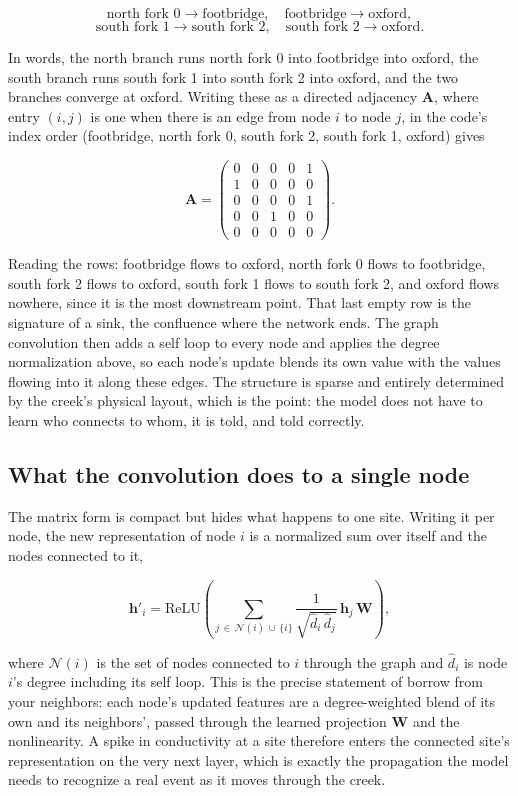 \documentclass[11pt]{article}
\begin{document}
\[
\text{north fork 0} \rightarrow \text{footbridge}, \quad
\text{footbridge} \rightarrow \text{oxford},
\]
\[
\text{south fork 1} \rightarrow \text{south fork 2}, \quad
\text{south fork 2} \rightarrow \text{oxford}.
\]

In words, the north branch runs north fork 0 into footbridge into oxford, the south branch runs south fork 1 into south fork 2 into oxford, and the two branches converge at oxford. Writing these as a directed adjacency $\mathbf{A}$, where entry $(i,j)$ is one when there is an edge from node $i$ to node $j$, in the code's index order (footbridge, north fork 0, south fork 2, south fork 1, oxford) gives

\[
\mathbf{A} =
\begin{pmatrix}
0 & 0 & 0 & 0 & 1 \\
1 & 0 & 0 & 0 & 0 \\
0 & 0 & 0 & 0 & 1 \\
0 & 0 & 1 & 0 & 0 \\
0 & 0 & 0 & 0 & 0
\end{pmatrix}.
\]

Reading the rows: footbridge flows to oxford, north fork 0 flows to footbridge, south fork 2 flows to oxford, south fork 1 flows to south fork 2, and oxford flows nowhere, since it is the most downstream point. That last empty row is the signature of a sink, the confluence where the network ends. The graph convolution then adds a self loop to every node and applies the degree normalization above, so each node's update blends its own value with the values flowing into it along these edges. The structure is sparse and entirely determined by the creek's physical layout, which is the point: the model does not have to learn who connects to whom, it is told, and told correctly.

\subsection*{What the convolution does to a single node}

The matrix form is compact but hides what happens to one site. Writing it per node, the new representation of node $i$ is a normalized sum over itself and the nodes connected to it,

\[
\mathbf{h}'_i = \mathrm{ReLU}\!\left( \sum_{j \,\in\, \mathcal{N}(i) \,\cup\, \{i\}} \frac{1}{\sqrt{\hat{d}_i \, \hat{d}_j}} \, \mathbf{h}_j \, \mathbf{W} \right),
\]

where $\mathcal{N}(i)$ is the set of nodes connected to $i$ through the graph and $\hat{d}_i$ is node $i$'s degree including its self loop. This is the precise statement of borrow from your neighbors: each node's updated features are a degree-weighted blend of its own and its neighbors', passed through the learned projection $\mathbf{W}$ and the nonlinearity. A spike in conductivity at a site therefore enters the connected site's representation on the very next layer, which is exactly the propagation the model needs to recognize a real event as it moves through the creek.
\end{document}
